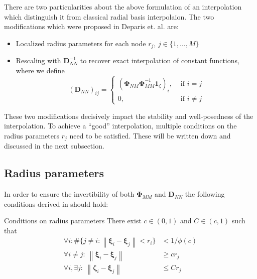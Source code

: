 \documentclass[11pt, a4paper]{article}
\begin{document}
There are two particularities about the above formulation of an interpolation which distinguish it from classical radial basis interpolaion. The two modifications which were proposed in Deparis et. al. \cite{deparis} are:

\begin{itemize}
    \item Localized radius parameters for each node $r_{j}$, $j \in \{1, \dots, M\}$
    \item Rescaling with $\mathbf{D}_{NN}^{-1}$ to recover exact interpolation of constant functions, where we define
    \begin{equation}
        (\mathbf{D}_{NN})_{ij} =
        \begin{cases}
            (\boldsymbol{\Phi}_{NM}\boldsymbol{\Phi}_{MM}^{-1}\boldsymbol{1}_{\zeta})_i, &\text{ if } i = j \\
            0, &\text{ if } i \neq j
        \end{cases}
    \end{equation}
\end{itemize}

These two modifications decisively impact the stability and well-posedness of the interpolation. To achieve a \enquote{good} interpolation, multiple conditions on the radius parameters $r_j$ need to be satisfied. These will be written down and discussed in the next subsection.

\subsection{Radius parameters}
\label{subsec:radius-parameters}

In order to ensure the invertibility of both $\boldsymbol{\Phi}_{MM}$ and $\mathbf{D}_{NN}$ the following conditions derived in \cite{voet} should hold:

\begin{block}{Conditions on radius parameters}
There exist $c \in (0, 1)$ and $C \in (c, 1)$ such that
\begin{align}
    \forall i: \# \{j \neq i: \left\| \boldsymbol{\xi}_i - \boldsymbol{\xi}_j \right\| < r_i \} &< 1 / \phi(c) \label{con:support-condition}  \tag{Condition 1} \\
    \forall i \neq j:~\left\| \boldsymbol{\xi}_i - \boldsymbol{\xi}_j \right\| &\geq c r_j \label{con:c-condition}  \tag{Condition 2}  \\
    \forall i, \exists j:~\left\| \boldsymbol{\zeta}_i - \boldsymbol{\xi}_j \right\| &\leq C r_j \label{con:C-condition}  \tag{Condition 3} 
\end{align}
\end{block}
\end{document}
